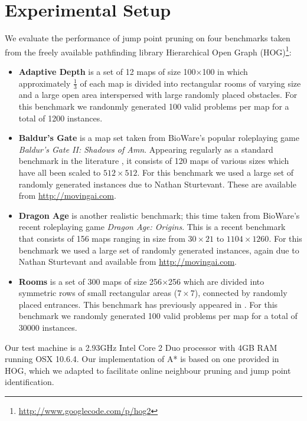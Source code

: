 \section{Experimental Setup}
We evaluate the performance of jump point pruning on four benchmarks taken from the freely
available pathfinding library Hierarchical Open Graph
(HOG)\footnote{\url{http://www.googlecode.com/p/hog2}}: 
\begin{itemize}

\item{\textbf{Adaptive Depth}
is a set of 12 maps of size 100$\times$100 in which approximately $\frac{1}{3}$
of each map is divided into rectangular rooms of varying size and a large
open area interspersed with large randomly placed obstacles.
For this benchmark we randonmly generated 100 valid problems per map for a 
total of 1200 instances.
} 

\item{\textbf{Baldur's Gate} is a map set taken from BioWare's popular
roleplaying game \emph{Baldur's Gate II: Shadows of Amn}.
Appearing regularly as a standard benchmark in the literature
\cite{bjornsson06,harabor10,pochter10}, 
it consists of 120 maps of various sizes which have all been scaled to
$512\times512$. 
For this benchmark we used a large set of randomly generated instances due to
Nathan Sturtevant. These are available from \url{http://movingai.com}.
}

\item{\textbf{Dragon Age} is another realistic benchmark; this time taken from
BioWare's recent roleplaying game \emph{Dragon Age: Origins}.
This is a recent benchmark that consists of 156 maps ranging in size 
from $30\times21$ to $1104\times1260$.
For this benchmark we used a large set of randomly generated instances,
again due to Nathan Sturtevant and available from \url{http://movingai.com}.
}

\item{\textbf{Rooms} is a set of 300 maps of size
256$\times$256 which are divided into symmetric rows of small rectangular areas
($7\times7$), connected by randomly placed entrances. This benchmark has
previously appeared in \cite{pochter10}.
For this benchmark we randomly generated 100 valid problems per map for a 
total of 30000 instances.
}
\end{itemize}

Our test machine is a 2.93GHz Intel Core 2 Duo processor with 4GB RAM running OSX 
10.6.4.  Our implementation of A* is based on one provided in HOG, which we 
adapted to facilitate online neighbour pruning and jump point identification. 
